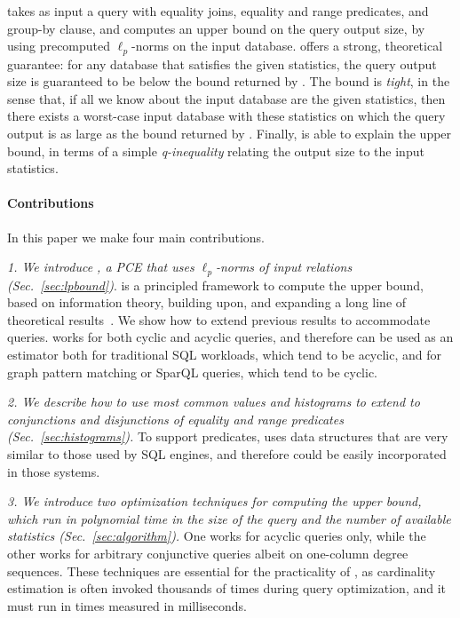 \system takes as input a query with equality joins,
equality and range predicates, and group-by clause, and computes an upper
bound on the query output size, by using precomputed $\ell_p$-norms on the input
database. \system offers a strong, theoretical guarantee: for any database that satisfies the
given statistics, the query output size is guaranteed to be below the
bound returned by \system.  The bound is \emph{tight}, in the sense
that, if all we know about the input database are the given
statistics, then there exists a worst-case input database with these
statistics on which the query output is as large as the bound
returned by \system.  Finally, \system is able to explain the upper
bound, in terms of a simple \emph{q-inequality} relating the output
size to the input statistics.

\paragraph{Contributions} In this paper we make four main contributions.  

{\em 1. We introduce \system, a PCE that uses $\ell_p$-norms of input relations (Sec.~\ref{sec:lpbound})}. 
\system is a principled framework to compute the upper bound, based on
information theory, building upon, and expanding a long line of
theoretical
results~\cite{DBLP:journals/siamcomp/AtseriasGM13,DBLP:journals/jacm/GottlobLVV12,DBLP:conf/pods/KhamisNS16,DBLP:conf/pods/Khamis0S17,DBLP:journals/pacmmod/KhamisNOS24}.
We show how to extend previous results to 
accommodate \groupby queries. \system works for both cyclic and
acyclic queries, and therefore can be used as an estimator both for
traditional SQL workloads, which tend to be acyclic, and for graph
pattern matching or SparQL queries, which tend to be cyclic.  

{\em 2. We describe how to use most common values and histograms to extend \system to conjunctions and disjunctions of equality and range predicates (Sec.~\ref{sec:histograms}).}
To support predicates, \system uses data structures that are very similar to those used by SQL engines, and therefore \system could be easily incorporated in those systems.

{\em 3. We introduce two optimization techniques for computing the upper bound, which
run in polynomial time in the size of the query and the number of
available statistics (Sec.~\ref{sec:algorithm}).} One works for acyclic queries only, while the other works for arbitrary conjunctive queries albeit on one-column degree sequences.
These techniques are essential for the practicality of \system, as  cardinality estimation is often invoked thousands of times during query optimization, and it must run in times
measured in milliseconds.

